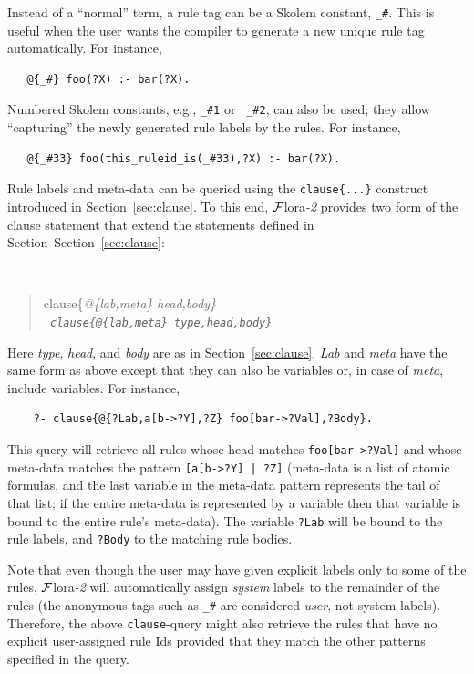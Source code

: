 \documentclass[11pt]{article}
\newcommand{\FLORA}{{\mbox{\sc ${\cal F}${lora}\rm\emph{-2}}}\xspace}
\begin{document}
Instead of a ``normal'' term, a rule tag can be a Skolem
constant, {\tt \_\#}.  This is useful when the user wants the compiler to
generate a new unique rule tag automatically. For instance,
\begin{verbatim}
   @{_#} foo(?X) :- bar(?X).
\end{verbatim}
Numbered Skolem constants, e.g., {\tt \_\#1} or {\tt
  \_\#2}, can also be used;
they allow ``capturing'' the newly generated
rule labels by the rules. For instance,
\begin{verbatim}
   @{_#33} foo(this_ruleid_is(_#33),?X) :- bar(?X).
\end{verbatim}

Rule labels and meta-data can be queried using the {\tt clause\{...\}}
construct introduced in Section~\ref{sec:clause}. To this end, \FLORA
provides two form of the clause statement that extend the statements
defined in Section~Section~\ref{sec:clause}:
{\tt
\begin{quote}
clause\{\it{@\{lab,meta\} head,body}\}\\
\tt
clause\{\it{@\{lab,meta\} type,head,body}\}
\end{quote}
}
Here \emph{type}, \emph{head}, and \emph{body} are as in
Section~\ref{sec:clause}. \emph{Lab} and \emph{meta} have the same form as
above except that they can also be variables or, in case of \emph{meta},
include variables. For instance,
\begin{verbatim}
    ?- clause{@{?Lab,a[b->?Y],?Z} foo[bar->?Val],?Body}.
\end{verbatim}
This query will retrieve all rules whose head matches {\tt foo[bar->?Val]}
and whose meta-data matches the pattern {\tt [a[b->?Y] | ?Z]} (meta-data is
a list of atomic formulas, and the last variable in the meta-data pattern
represents the tail of that list; if the entire meta-data is represented by
a variable then that variable is bound to the entire rule's meta-data).
The variable {\tt ?Lab} will be bound to the rule labels, and {\tt ?Body}
to the matching rule bodies.

Note that even though the user may have given
explicit labels only to some of the rules, \FLORA will automatically
assign \emph{system} labels to the remainder of the rules (the anonymous
tags such as {\tt \_\#} are considered \emph{user}, not system labels).
Therefore, the above {\tt clause}-query might also retrieve  
the rules that have no explicit user-assigned rule Ids provided that they
match the other patterns specified in the query.
\end{document}
